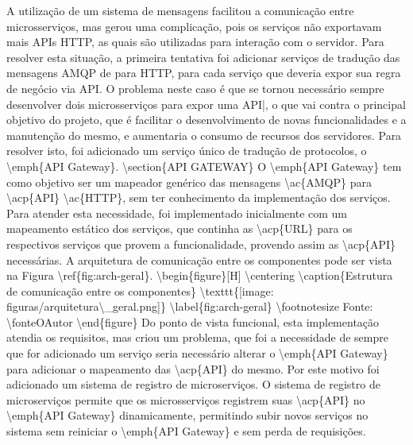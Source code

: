 A utilização de um sistema de mensagens facilitou a comunicação entre microsserviços,
mas gerou uma complicação, pois os serviços não exportavam mais \acp{API} \ac{HTTP},
as quais são utilizadas para interação com o servidor. Para resolver esta situação,
a primeira tentativa foi adicionar serviços de tradução das mensagens \ac{AMQP} de
para \ac{HTTP}, para cada serviço que deveria expor sua regra de negócio via \ac{API}.
O problema neste caso é que se tornou necessário sempre desenvolver dois microsserviços
para expor uma \ac{API|, o que vai contra o principal objetivo do projeto, que é facilitar
o desenvolvimento de novas funcionalidades e a manutenção do mesmo, e aumentaria o
consumo de recursos dos servidores. Para resolver isto, foi adicionado um serviço
único de tradução de protocolos, o \emph{API Gateway}.

\section{API GATEWAY}

O \emph{API Gateway} tem como objetivo ser um mapeador genérico das mensagens
\ac{AMQP} para \acp{API} \ac{HTTP}, sem ter conhecimento da implementação dos
serviços. Para atender esta necessidade, foi implementado inicialmente com um
mapeamento estático dos serviços, que continha as \acp{URL} para os respectivos
serviços que provem a funcionalidade, provendo assim as \acp{API} necessárias.
A arquitetura de comunicação entre os componentes pode ser vista na Figura
\ref{fig:arch-geral}.

\begin{figure}[H]
	\centering
	\caption{Estrutura de comunicação entre os componentes}
	\texttt{[image: figuras/arquitetura\_geral.png]}

    \label{fig:arch-geral}
	\footnotesize Fonte: \fonteOAutor
\end{figure}

Do ponto de vista funcional, esta implementação atendia os requisitos, mas
criou um problema, que foi a necessidade de sempre que for adicionado um
serviço seria necessário alterar o \emph{API Gateway} para adicionar o mapeamento
das \acp{API} do mesmo. Por este motivo foi adicionado um sistema de registro
de microserviços. O sistema de registro de microserviços permite que os
microsserviços registrem suas \acp{API} no \emph{API Gateway} dinamicamente,
permitindo subir novos serviços no sistema sem reiniciar o \emph{API Gateway}
e sem perda de requisições.

}
